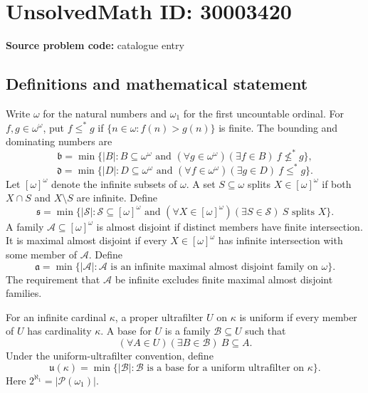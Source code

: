 \documentclass[11pt]{article}
\begin{document}
\section*{UnsolvedMath ID: 30003420}
\textbf{Source problem code:} catalogue entry
\subsection{Definitions and mathematical statement}
Write \(\omega\) for the natural numbers and \(\omega_1\) for the first uncountable ordinal. For \(f,g\in\omega^\omega\), put \(f\leq^*g\) if \(\{n\in\omega:f(n)>g(n)\}\) is finite. The bounding and dominating numbers are
\[
\mathfrak b=\min\{|B|:B\subseteq\omega^\omega\text{ and }(\forall g\in\omega^\omega)(\exists f\in B)\ f\not\leq^*g\},
\]
\[
\mathfrak d=\min\{|D|:D\subseteq\omega^\omega\text{ and }(\forall f\in\omega^\omega)(\exists g\in D)\ f\leq^*g\}.
\]
Let \([\omega]^\omega\) denote the infinite subsets of \(\omega\). A set \(S\subseteq\omega\) splits \(X\in[\omega]^\omega\) if both \(X\cap S\) and \(X\setminus S\) are infinite. Define
\[
\mathfrak s=\min\{|\mathcal S|:\mathcal S\subseteq[\omega]^\omega\text{ and }(\forall X\in[\omega]^\omega)(\exists S\in\mathcal S)\ S\text{ splits }X\}.
\]
A family \(\mathcal A\subseteq[\omega]^\omega\) is almost disjoint if distinct members have finite intersection. It is maximal almost disjoint if every \(X\in[\omega]^\omega\) has infinite intersection with some member of \(\mathcal A\). Define
\[
\mathfrak a=\min\{|\mathcal A|:\mathcal A\text{ is an infinite maximal almost disjoint family on }\omega\}.
\]
The requirement that \(\mathcal A\) be infinite excludes finite maximal almost disjoint families.

For an infinite cardinal \(\kappa\), a proper ultrafilter \(U\) on \(\kappa\) is uniform if every member of \(U\) has cardinality \(\kappa\). A base for \(U\) is a family \(\mathcal B\subseteq U\) such that
\[
(\forall A\in U)(\exists B\in\mathcal B)\ B\subseteq A.
\]
Under the uniform-ultrafilter convention, define
\[
\mathfrak u(\kappa)=\min\{|\mathcal B|:\mathcal B\text{ is a base for a uniform ultrafilter on }\kappa\}.
\]
Here \(2^{\aleph_1}=|\mathcal P(\omega_1)|\).
\end{document}
